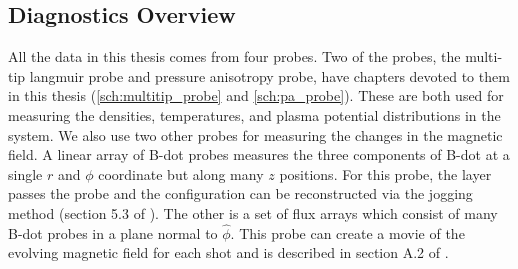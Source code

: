 


\subsection{Diagnostics Overview}
\label{sss:diagnostics_overview}

All the data in this thesis comes from four probes. Two of the probes, the multi-tip langmuir probe and pressure anisotropy probe, have chapters devoted to them in this thesis (\ref{sch:multitip_probe} and \ref{sch:pa_probe}). These are both used for measuring the densities, temperatures, and plasma potential distributions in the system. We also use two other probes for measuring the changes in the magnetic field. A linear array of B-dot probes measures the three components of B-dot at a single $r$ and $\phi$ coordinate but along many $z$ positions. For this probe, the layer passes the probe and the configuration can be reconstructed via the jogging method (section 5.3 of \cite{Greess}). The other is a set of flux arrays which consist of many B-dot probes in a plane normal to $\hat{\phi}$. This probe can create a movie of the evolving magnetic field for each shot and is described in section A.2 of \cite{Gradney_2025}.





